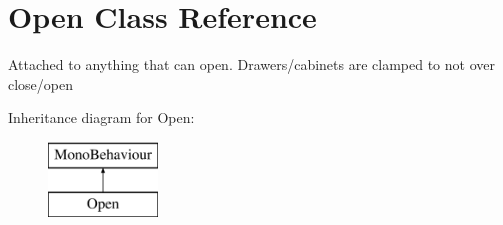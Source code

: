 \hypertarget{class_open}{}\section{Open Class Reference}
\label{class_open}


Attached to anything that can open. Drawers/cabinets are clamped to not over close/open  


Inheritance diagram for Open\+:\begin{figure}[H]
\begin{center}
\leavevmode
\includegraphics[height=2.000000cm]{class_open}
\end{center}
\end{figure}
